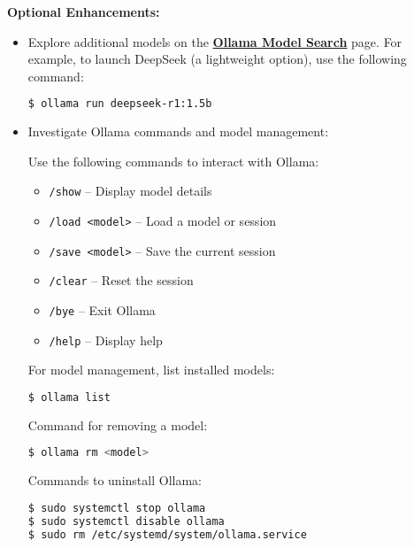 \noindent \textbf{Optional Enhancements:}
\begin{itemize}
\item Explore additional models on the \href{https://ollama.com/search}{\textbf{\color{blue}Ollama Model Search}} page. For example, to launch DeepSeek (a lightweight option), use the following command:  
\begin{lstlisting}[language=bash, breaklines=true, breakatwhitespace=true, columns=fullflexible]
$ ollama run deepseek-r1:1.5b
\end{lstlisting}

\item Investigate Ollama commands and model management:

Use the following commands to interact with Ollama:
\begin{itemize}
\item \texttt{/show} – Display model details
\item \texttt{/load <model>} – Load a model or session
\item \texttt{/save <model>} – Save the current session
\item \texttt{/clear} – Reset the session
\item \texttt{/bye} – Exit Ollama
\item \texttt{/help} – Display help
\end{itemize}

For model management, list installed models:
\begin{lstlisting}[language=bash, breaklines=true, breakatwhitespace=true, columns=fullflexible]
$ ollama list
\end{lstlisting}

Command for removing a model:
\begin{lstlisting}[language=bash, breaklines=true, breakatwhitespace=true, columns=fullflexible]
$ ollama rm <model>
\end{lstlisting}

Commands to uninstall Ollama:
\begin{lstlisting}[language=bash, breaklines=true, breakatwhitespace=true, columns=fullflexible]
$ sudo systemctl stop ollama
$ sudo systemctl disable ollama
$ sudo rm /etc/systemd/system/ollama.service
\end{lstlisting}

\end{itemize}